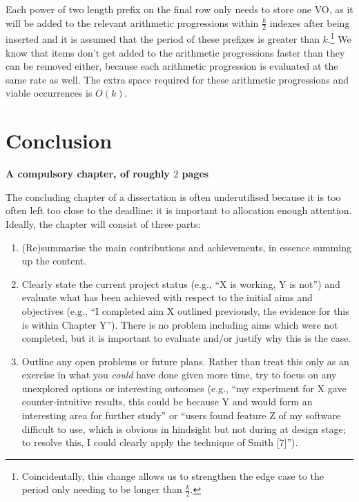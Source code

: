 \documentclass[ %
                    author={Dominic Joseph Moylett},
                    degree={MEng},
                     title={Dictionary Matching with Fingerprints},
                  subtitle={An Empirical Analysis},
                      type={research},
                      year={2015} ]{dissertation}
\begin{document}
Each power of two length prefix on the final row only needs to store one VO, as it will be added to the relevant arithmetic progressions within $\frac{k}{2}$ indexes after being inserted and it is assumed that the period of these prefixes is greater than $k$.\footnote{Coincidentally, this change allows us to strengthen the edge case to the period only needing to be longer than $\frac{k}{2}$.} We know that items don't get added to the arithmetic progressions faster than they can be removed either, because each arithmetic progression is evaluated at the same rate as well. The extra space required for these arithmetic progressions and viable occurrences is $O(k)$.


\chapter{Conclusion}
\label{chap:conclusion}

{\bf A compulsory chapter, of roughly $2$ pages} 
\vspace{1cm} 

\noindent
The concluding chapter of a dissertation is often underutilised because it 
is too often left too close to the deadline: it is important to allocation
enough attention.  Ideally, the chapter will consist of three parts:

\begin{enumerate}
\item (Re)summarise the main contributions and achievements, in essence
      summing up the content.
\item Clearly state the current project status (e.g., ``X is working, Y 
      is not'') and evaluate what has been achieved with respect to the 
      initial aims and objectives (e.g., ``I completed aim X outlined 
      previously, the evidence for this is within Chapter Y'').  There 
      is no problem including aims which were not completed, but it is 
      important to evaluate and/or justify why this is the case.
\item Outline any open problems or future plans.  Rather than treat this
      only as an exercise in what you {\em could} have done given more 
      time, try to focus on any unexplored options or interesting outcomes
      (e.g., ``my experiment for X gave counter-intuitive results, this 
      could be because Y and would form an interesting area for further 
      study'' or ``users found feature Z of my software difficult to use,
      which is obvious in hindsight but not during at design stage; to 
      resolve this, I could clearly apply the technique of Smith [7]'').
\end{enumerate}
\end{document}
